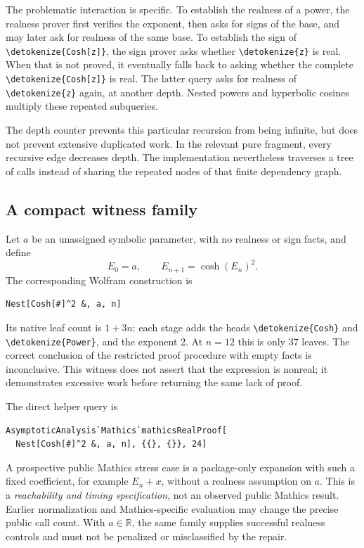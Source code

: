 \documentclass[11pt,letterpaper]{article}
\newcommand{\code}[1]{\expandafter\nolinkurl\expandafter{\detokenize{#1}}}
\begin{document}
The problematic interaction is specific. To establish the realness of a power, the realness prover first verifies the exponent, then asks for signs of the base, and may later ask for realness of the same base. To establish the sign of \code{Cosh[z]}, the sign prover asks whether \code{z} is real. When that is not proved, it eventually falls back to asking whether the complete \code{Cosh[z]} is real. The latter query asks for realness of \code{z} again, at another depth. Nested powers and hyperbolic cosines multiply these repeated subqueries.

The depth counter prevents this particular recursion from being infinite, but does not prevent extensive duplicated work. In the relevant pure fragment, every recursive edge decreases depth. The implementation nevertheless traverses a tree of calls instead of sharing the repeated nodes of that finite dependency graph.

\subsection{A compact witness family}

Let $a$ be an unassigned symbolic parameter, with no realness or sign facts, and define
\begin{equation}
 E_0=a,\qquad E_{n+1}=\cosh(E_n)^2.
 \label{eq:family}
\end{equation}
The corresponding Wolfram construction is
\begin{lstlisting}
Nest[Cosh[#]^2 &, a, n]
\end{lstlisting}

Its native leaf count is $1+3n$: each stage adds the heads \code{Cosh} and \code{Power}, and the exponent 2. At $n=12$ this is only 37 leaves. The correct conclusion of the restricted proof procedure with empty facts is inconclusive. This witness does not assert that the expression is nonreal; it demonstrates excessive work before returning the same lack of proof.

The direct helper query is
\begin{lstlisting}
AsymptoticAnalysis`Mathics`mathicsRealProof[
  Nest[Cosh[#]^2 &, a, n], {{}, {}}, 24]
\end{lstlisting}

A prospective public Mathics stress case is a package-only expansion with such a fixed coefficient, for example $E_n+x$, without a realness assumption on $a$. This is a \emph{reachability and timing specification}, not an observed public Mathics result. Earlier normalization and Mathics-specific evaluation may change the precise public call count. With $a\in\mathbb R$, the same family supplies successful realness controls and must not be penalized or misclassified by the repair.
\end{document}
